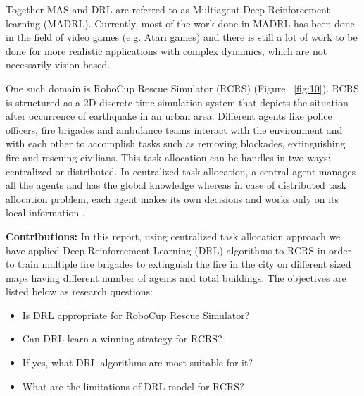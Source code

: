 \documentclass[12pt]{report}
\begin{document}
Together MAS and DRL are referred to as Multiagent Deep Reinforcement learning (MADRL). Currently, most of the work done in MADRL has been done in the field of video games (e.g. Atari games) and there is still a lot of work to be done for more realistic applications with complex dynamics, which are not necessarily vision based. 

One such domain is RoboCup Rescue Simulator (RCRS) (Figure ~\ref{fig:10}). RCRS is structured as a 2D discrete-time simulation system that depicts the situation after occurrence of earthquake in an urban area. Different agents like police officers, fire brigades and ambulance teams interact with the environment and with each other to accomplish tasks such as removing blockades, extinguishing fire and rescuing civilians. This task allocation can be handles in two ways: centralized or distributed. In centralized task allocation, a central agent manages all the agents and has the global knowledge whereas in case of distributed task allocation problem, each agent makes its own decisions and works only on its local information \cite{Nair}. 

\textbf{Contributions:} In this report, using centralized task allocation approach we have applied Deep Reinforcement Learning (DRL) algorithms to RCRS in order to train multiple fire brigades to extinguish the fire in the city on different sized maps having different number of agents and total buildings. The objectives are listed below as research questions: 


\begin{itemize}
    \item Is DRL appropriate for RoboCup Rescue Simulator?
    \item Can DRL learn a winning strategy for RCRS?
    \item If yes, what DRL algorithms are most suitable for it?
    \item What are the limitations of DRL model for RCRS?
    
\end{itemize}
\end{document}
